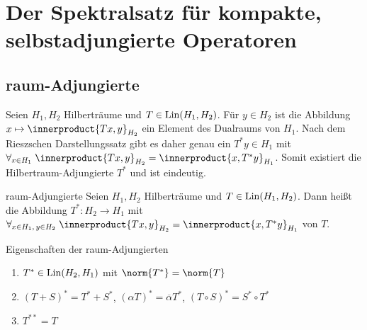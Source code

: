 \chapter{%
    Der Spektralsatz für kompakte, selbstadjungierte Operatoren%
}

\section{%
    raum-Adjungierte%
}

\begin{Bem}
    Seien $H_1, H_2$ Hilberträume und $T \in \operatorname{Lin}(H_1, H_2)$.
    Für $y \in H_2$ ist die Abbildung $x \mapsto \innerproduct{Tx, y}_{H_2}$ ein Element des Dualraums
    von $H_1$.
    Nach dem Rieszschen Darstellungssatz gibt es daher genau ein $T^\ast y \in H_1$ mit
    $\forall_{x \in H_1}\; \innerproduct{Tx, y}_{H_2} = \innerproduct{x, T^\ast y}_{H_1}$.
    Somit existiert die Hilbertraum-Adjungierte $T^\ast$ und ist eindeutig.
\end{Bem}

\begin{Def}{raum-Adjungierte}
    Seien $H_1, H_2$ Hilberträume und $T \in \operatorname{Lin}(H_1, H_2)$.
    Dann heißt die Abbildung $T^\ast\colon H_2 \rightarrow H_1$ mit
    $\forall_{x \in H_1,\, y \in H_2}\; \innerproduct{Tx, y}_{H_2} = \innerproduct{x, T^\ast y}_{H_1}$
     von $T$.
\end{Def}

\begin{Lemma}{Eigenschaften der raum-Adjungierten}
    \begin{enumerate}
        \item
        $T^\ast \in \operatorname{Lin}(H_2, H_1)$ mit $\norm{T^\ast} = \norm{T}$

        \item
        $(T + S)^\ast = T^\ast + S^\ast$, $(\alpha T)^\ast = \overline{\alpha} T^\ast$,
        $(T \circ S)^\ast = S^\ast \circ T^\ast$

        \item
        $T^{\ast\ast} = T$
    \end{enumerate}
\end{Lemma}

\linie

